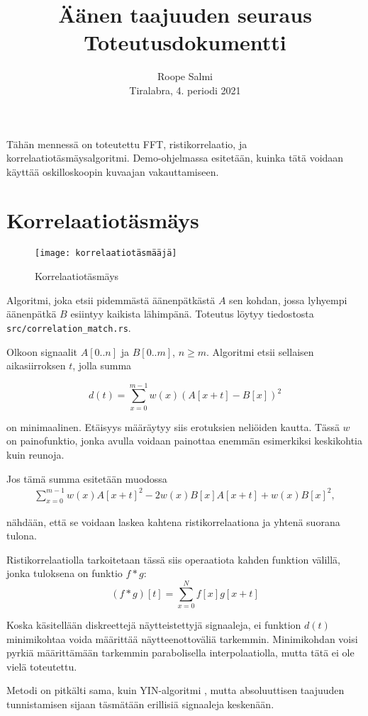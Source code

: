 \documentclass[11pt,oneside,a4paper]{memoir}
\title{Äänen taajuuden seuraus\\ Toteutusdokumentti}
\author{Roope Salmi\\ Tiralabra, 4. periodi 2021}
\date{}
\begin{document}
\maketitle

Tähän mennessä on toteutettu FFT, ristikorrelaatio, ja korrelaatiotäsmäysalgoritmi.
Demo-ohjelmassa esitetään, kuinka tätä voidaan käyttää oskilloskoopin kuvaajan vakauttamiseen.

\section*{Korrelaatiotäsmäys}
\begin{figure}
\centering
\texttt{[image: korrelaatiotäsmääjä]}
\caption{Korrelaatiotäsmäys}
\label{fig:korrelaatio}
\end{figure}

Algoritmi, joka etsii pidemmästä äänenpätkästä $A$ sen kohdan, jossa
lyhyempi äänenpätkä $B$ esiintyy kaikista lähimpänä. Toteutus löytyy tiedostosta
\texttt{src/correlation\_match.rs}.

Olkoon signaalit $A[0..n]$ ja $B[0..m]$, $n \ge m$.
Algoritmi etsii sellaisen aikasiirroksen $t$, jolla summa

\[
d(t) = \sum_{x=0}^{m-1} w(x) (A[x+t] - B[x])^2
\]

on minimaalinen. Etäisyys määräytyy siis erotuksien neliöiden kautta.
Tässä $w$ on painofunktio, jonka avulla voidaan painottaa enemmän esimerkiksi
keskikohtia kuin reunoja.

\clearpage
Jos tämä summa esitetään muodossa
\begin{align*}
\sum_{x=0}^{m-1} w(x) A[x+t]^2 - 2w(x) B[x] A[x+t] + w(x) B[x]^2,
\end{align*}

nähdään, että se voidaan laskea kahtena ristikorrelaationa ja yhtenä suorana tulona.

Ristikorrelaatiolla tarkoitetaan tässä siis operaatiota kahden funktion välillä, jonka
tuloksena on funktio $f * g$:
\[
(f * g)[t] = \sum_{x=0}^{N} f[x] g[x+t]
\]

Koska käsitellään diskreettejä näytteistettyjä signaaleja, ei funktion $d(t)$
minimikohtaa voida määrittää näytteenottoväliä tarkemmin.
Minimikohdan voisi pyrkiä määrittämään tarkemmin parabolisella interpolaatiolla,
mutta tätä ei ole vielä toteutettu.

Metodi on pitkälti sama, kuin YIN-algoritmi \cite{yin}, mutta absoluuttisen taajuuden tunnistamisen
sijaan täsmätään erillisiä signaaleja keskenään.
\end{document}

